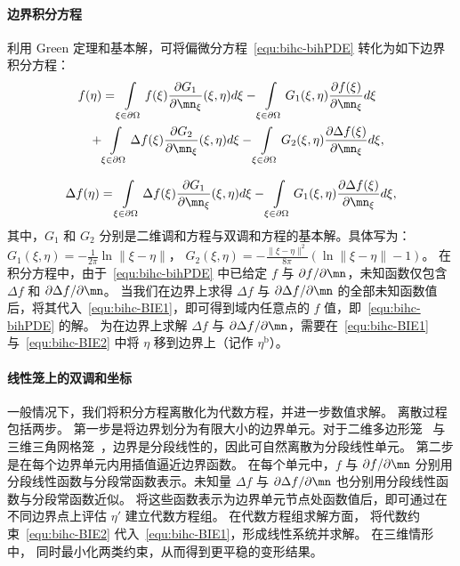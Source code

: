 \paragraph{边界积分方程}
利用 Green 定理和基本解，可将偏微分方程~\eqref{equ:bihc-bihPDE} 转化为如下边界积分方程：
\begin{equation}\label{equ:bihc-BIE1}
\begin{aligned}
f(\eta) &=
\int\limits_{\xi \in \partial \Omega}
f(\xi) \frac{\partial G_1}{\partial \mn_{\xi}}(\xi, \eta)d\xi -
\int\limits_{\xi \in \partial \Omega}
G_1(\xi, \eta) \frac{\partial f(\xi)}{\partial \mn_{\xi}}d\xi \\
+ &\int\limits_{\xi \in \partial \Omega}
\Delta f(\xi) \frac{\partial G_2}{\partial \mn_{\xi}}(\xi, \eta)d\xi -
\int\limits_{\xi \in \partial \Omega}
G_2(\xi, \eta) \frac{\partial \Delta f(\xi)}{\partial \mn_{\xi}}d\xi,
\end{aligned}
\end{equation}

\begin{equation}\label{equ:bihc-BIE2}
\begin{aligned}
\Delta f(\eta) =
\int\limits_{\xi \in \partial \Omega}
\Delta f(\xi) \frac{\partial G_1}{\partial \mn_{\xi}}(\xi, \eta)d\xi -
\int\limits_{\xi \in \partial \Omega}
G_1(\xi, \eta) \frac{\partial \Delta f(\xi)}{\partial \mn_{\xi}}d\xi,
\end{aligned}
\end{equation}
其中，$G_1$ 和 $G_2$ 分别是二维调和方程与双调和方程的基本解。具体写为：
$G_1(\xi,\eta)=-\frac{1}{2 \pi}\ln\|\xi-\eta\|$，
$G_2(\xi,\eta)=-\frac{\|\xi-\eta\|^2}{8 \pi}(\ln\|\xi-\eta\|-1)$。
%
在积分方程中，由于~\eqref{equ:bihc-bihPDE} 中已给定 \(f\) 与 \(\partial f/\partial \mn\)，未知函数仅包含 \(\Delta f\) 和 \(\partial \Delta f/\partial \mn\)。
当我们在边界上求得 \(\Delta f\) 与 \(\partial \Delta f/\partial \mn\) 的全部未知函数值后，将其代入~\eqref{equ:bihc-BIE1}，即可得到域内任意点的 $f$ 值，即~\eqref{equ:bihc-bihPDE} 的解。
%
为在边界上求解 \(\Delta f\) 与 \(\partial \Delta f/\partial \mn\)，需要在~\eqref{equ:bihc-BIE1} 与~\eqref{equ:bihc-BIE2} 中将 \(\eta\) 移到边界上（记作 \(\eta^{\text{b}}\)）。

\paragraph{线性笼上的双调和坐标}
一般情况下，我们将积分方程离散化为代数方程，并进一步数值求解。
%
离散过程包括两步。
第一步是将边界划分为有限大小的边界单元。对于二维多边形笼~\cite{Weber2012} 与三维三角网格笼~\cite{thiery2024biharmonic}，边界是分段线性的，因此可自然离散为分段线性单元。
%
第二步是在每个边界单元内用插值逼近边界函数。
在每个单元中，\(f\) 与 \(\partial f/\partial \mn\) 分别用分段线性函数与分段常函数表示。未知量 \(\Delta f\) 与 \(\partial \Delta f/\partial \mn\) 也分别用分段线性函数与分段常函数近似。
%
将这些函数表示为边界单元节点处函数值后，即可通过在不同边界点上评估 \(\eta'\) 建立代数方程组。
%
在代数方程组求解方面，\citet{Weber2012} 将代数约束~\eqref{equ:bihc-BIE2} 代入~\eqref{equ:bihc-BIE1}，形成线性系统并求解。
在三维情形中，\citet{thiery2024biharmonic} 同时最小化两类约束，从而得到更平稳的变形结果。

